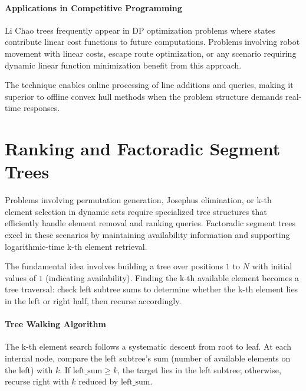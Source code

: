 
\paragraph{Applications in Competitive Programming}

Li Chao trees frequently appear in DP optimization problems where states contribute linear cost functions to future computations. Problems involving robot movement with linear costs, escape route optimization, or any scenario requiring dynamic linear function minimization benefit from this approach.

The technique enables online processing of line additions and queries, making it superior to offline convex hull methods when the problem structure demands real-time responses.

\section{Ranking and Factoradic Segment Trees}
\label{sec:ranking_factoradic}

Problems involving permutation generation, Josephus elimination, or k-th element selection in dynamic sets require specialized tree structures that efficiently handle element removal and ranking queries. Factoradic segment trees excel in these scenarios by maintaining availability information and supporting logarithmic-time k-th element retrieval.

The fundamental idea involves building a tree over positions $1$ to $N$ with initial values of $1$ (indicating availability). Finding the k-th available element becomes a tree traversal: check left subtree sums to determine whether the k-th element lies in the left or right half, then recurse accordingly.

\paragraph{Tree Walking Algorithm}

The k-th element search follows a systematic descent from root to leaf. At each internal node, compare the left subtree's sum (number of available elements on the left) with $k$. If $\text{left\_sum} \geq k$, the target lies in the left subtree; otherwise, recurse right with $k$ reduced by $\text{left\_sum}$.

